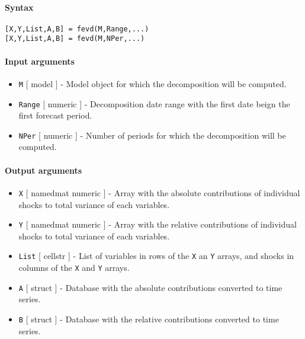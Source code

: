 


	\paragraph{Syntax}\label{syntax}

\begin{verbatim}
[X,Y,List,A,B] = fevd(M,Range,...)
[X,Y,List,A,B] = fevd(M,NPer,...)
\end{verbatim}

\paragraph{Input arguments}\label{input-arguments}

\begin{itemize}
\item
  \texttt{M} {[} model {]} - Model object for which the decomposition
  will be computed.
\item
  \texttt{Range} {[} numeric {]} - Decomposition date range with the
  first date beign the first forecast period.
\item
  \texttt{NPer} {[} numeric {]} - Number of periods for which the
  decomposition will be computed.
\end{itemize}

\paragraph{Output arguments}\label{output-arguments}

\begin{itemize}
\item
  \texttt{X} {[} namedmat \textbar{} numeric {]} - Array with the
  absolute contributions of individual shocks to total variance of each
  variables.
\item
  \texttt{Y} {[} namedmat \textbar{} numeric {]} - Array with the
  relative contributions of individual shocks to total variance of each
  variables.
\item
  \texttt{List} {[} cellstr {]} - List of variables in rows of the
  \texttt{X} an \texttt{Y} arrays, and shocks in columns of the
  \texttt{X} and \texttt{Y} arrays.
\item
  \texttt{A} {[} struct {]} - Database with the absolute contributions
  converted to time series.
\item
  \texttt{B} {[} struct {]} - Database with the relative contributions
  converted to time series.
\end{itemize}

